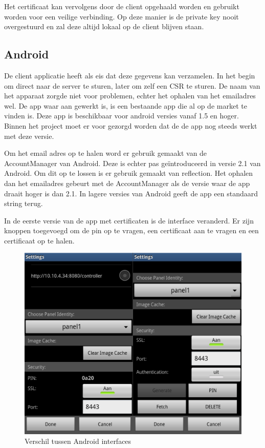 \documentclass[]{article}
\begin{document}
Het certificaat kan vervolgens door de client opgehaald worden en gebruikt
worden voor een veilige verbinding. Op deze manier is de private key nooit
overgestuurd en zal deze altijd lokaal op de client blijven staan. 

\subsection{Android}
De client applicatie heeft als eis dat deze gegevens kan verzamelen. In het
begin om direct naar de server te sturen, later om zelf een CSR te sturen. De
naam van het apparaat zorgde niet voor problemen, echter het ophalen van het
emailadres wel. De app waar aan gewerkt is, is een bestaande app die al op de
market te vinden is. Deze app is beschikbaar voor android versies vanaf 1.5 en
hoger. Binnen het project moet er voor gezorgd worden dat de de app nog steeds
werkt met deze versie.

Om het email adres op te halen word er gebruik gemaakt van de AccountManager van
Android. Deze is echter pas ge\"introduceerd in versie 2.1 van Android. Om dit
op te lossen is er gebruik gemaakt van reflection. Het ophalen dan het
emailadres gebeurt met de AccountManager als de versie waar de app draait hoger
is dan 2.1. In lagere versies van Android geeft de app een standaard string
terug.

In de eerste versie van de app met certificaten is de interface veranderd. Er
zijn knoppen toegevoegd om de pin op te vragen, een certificaat aan te vragen en
een certificaat op te halen.

\begin{figure}[htpb]
   \begin{center}
     \includegraphics[height=0.4\textheight]{device-android.pdf}
   \end{center}
   \caption{Verschil tussen Android interfaces}
   \label{androidv2}
\end{figure}
\end{document}
